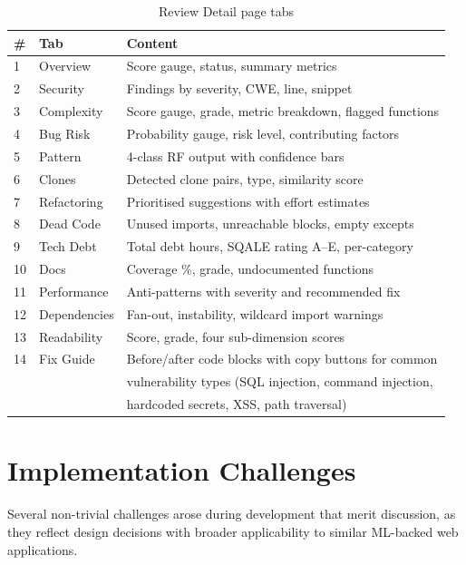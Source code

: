 \documentclass[12pt, oneside]{report}
\begin{document}
\begin{table}[H]
\centering
\caption{Review Detail page tabs}
\label{tab:tabs}
\begin{tabular}{@{}lll@{}}
\toprule
\textbf{\#} & \textbf{Tab} & \textbf{Content} \\
\midrule
1  & Overview       & Score gauge, status, summary metrics \\
2  & Security       & Findings by severity, CWE, line, snippet \\
3  & Complexity     & Score gauge, grade, metric breakdown, flagged functions \\
4  & Bug Risk       & Probability gauge, risk level, contributing factors \\
5  & Pattern        & 4-class RF output with confidence bars \\
6  & Clones         & Detected clone pairs, type, similarity score \\
7  & Refactoring    & Prioritised suggestions with effort estimates \\
8  & Dead Code      & Unused imports, unreachable blocks, empty excepts \\
9  & Tech Debt      & Total debt hours, SQALE rating A--E, per-category \\
10 & Docs           & Coverage \%, grade, undocumented functions \\
11 & Performance    & Anti-patterns with severity and recommended fix \\
12 & Dependencies   & Fan-out, instability, wildcard import warnings \\
13 & Readability    & Score, grade, four sub-dimension scores \\
14 & Fix Guide      & Before/after code blocks with copy buttons for common \\
   &                & vulnerability types (SQL injection, command injection, \\
   &                & hardcoded secrets, XSS, path traversal) \\
\bottomrule
\end{tabular}
\end{table}

\section{Implementation Challenges}
\label{sec:challenges}

Several non-trivial challenges arose during development that merit discussion, as they
reflect design decisions with broader applicability to similar ML-backed web applications.
\end{document}
